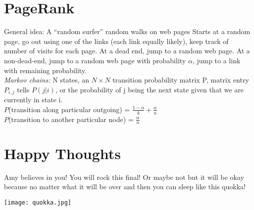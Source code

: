 \documentclass[10pt,twocolumn]{amsart}
\begin{document}
\section{PageRank}
General idea: A ``random surfer'' random walks on web pages Starts at a random page,
go out using one of the links (each link equally likely), keep track
of number of visits for each page. At a dead end, jump to a random web page.
At a non-dead-end, jump to a random web page with probability $\alpha$, jump to
a link with remaining probability. \\
\emph{Markov chains: } N states, an $N \times N$ transition probability matrix P,
matrix entry $P_{i, j}$ tells $P(j|i)$, or the probability of j being the next state
given that we are currently in state i. \\
$P$(transition along particular outgoing) =
$\frac{1-\alpha}{k} + \frac{\alpha}{n}$ \\
$P$(transition to another particular node) = $\frac{\alpha}{n}$
\section{Happy Thoughts}
Amy believes in you! You will rock this final! Or maybe not but it will be okay
because no matter what it will be over and then you can sleep like this quokka! \\
\begin{center}\texttt{[image: quokka.jpg]}\end{center}
\end{document}
